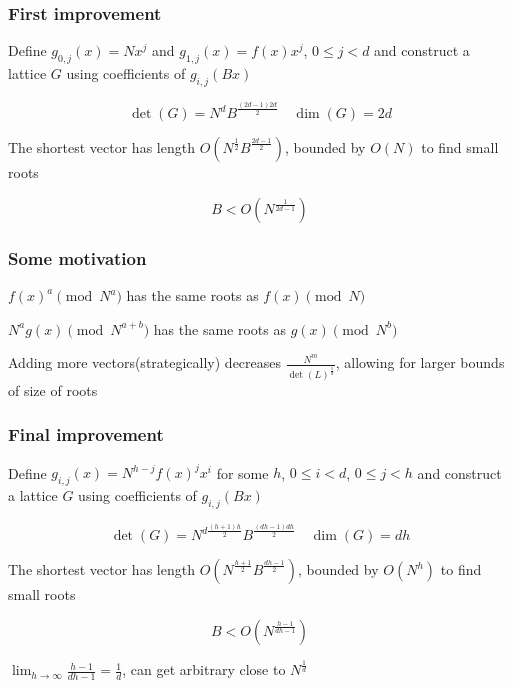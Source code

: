 \documentclass{beamer}
\begin{document}
\begin{frame}
    \frametitle{First improvement}
    Define $g_{0,j}(x)=Nx^j$ and $g_{1,j}(x)=f(x)x^j$, $0\leq j<d$ and construct a lattice $G$ using coefficients of $g_{i,j}(Bx)$

    $$\det(G)=N^dB^{\frac{(2d-1)2d}2}\quad\dim(G)=2d$$

    The shortest vector has length $O\left(N^{\frac12}B^{\frac{2d-1}2}\right)$, bounded by $O(N)$ to find small roots

    $$B<O\left(N^{\frac1{2d-1}}\right)$$
\end{frame}

\begin{frame}
    \frametitle{Some motivation}
    $f(x)^a\pmod{N^a}$ has the same roots as $f(x)\pmod N$\pause

    $N^ag(x)\pmod{N^{a+b}}$ has the same roots as $g(x)\pmod{N^b}$\pause

    Adding more vectors(strategically) decreases $\frac{N^m}{\det(L)^{\frac1d}}$, allowing for larger bounds of size of roots
\end{frame}

\begin{frame}
    \frametitle{Final improvement}
    Define $g_{i,j}(x)=N^{h-j}f(x)^jx^i$ for some $h$, $0\leq i<d$, $0\leq j<h$ and construct a lattice $G$ using coefficients of $g_{i,j}(Bx)$
    
    $$\det(G)=N^{d\frac{(h+1)h}2}B^{\frac{(dh-1)dh}2}\quad\dim(G)=dh$$

    The shortest vector has length $O\left(N^{\frac{h+1}2}B^{\frac{dh-1}2}\right)$, bounded by $O\left(N^h\right)$ to find small roots

    $$B<O\left(N^{\frac{h-1}{dh-1}}\right)$$

    $\lim_{h\to\infty}\frac{h-1}{dh-1}=\frac1d$, can get arbitrary close to $N^{\frac1d}$
\end{frame}
\end{document}
